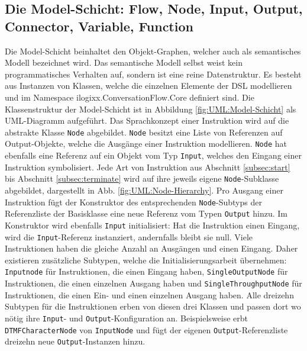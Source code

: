 \subsection[Die Model-Schicht]{Die Model-Schicht: Flow, Node, Input, Output, Connector, Variable, Function}
\label{subsec:Die Model-Schicht}
Die Model-Schicht beinhaltet den Objekt-Graphen, welcher auch als semantisches Modell bezeichnet wird. Das semantische Modell selbst weist kein programmatisches Verhalten auf, sondern ist eine reine Datenstruktur. Es besteht aus Instanzen von Klassen, welche die einzelnen Elemente der DSL modellieren und im Namespace ilogixx.ConversationFlow.Core definiert sind. Die Klassenstruktur der Model-Schicht ist in Abbildung \ref{fig:UML:Model-Schicht} als UML-Diagramm aufgeführt.
\newline
Das Sprachkonzept einer Instruktion wird auf die abstrakte Klasse \texttt{Node} abgebildet. \texttt{Node} besitzt eine Liste von Referenzen auf Output-Objekte, welche die Ausgänge einer Instruktion modellieren. \texttt{Node} hat ebenfalls eine Referenz auf ein Objekt vom Typ \texttt{Input}, welches den Eingang einer Instruktion symbolisiert. Jede Art von Instruktion aus Abschnitt \ref{subsec:start} bis Abschnitt \ref{subsec:terminate} wird auf ihre jeweils eigene \texttt{Node}-Subklasse abgebildet, dargestellt in Abb. \ref{fig:UML:Node-Hierarchy}. Pro Ausgang einer Instruktion fügt der Konstruktor des entsprechenden \texttt{Node}-Subtyps der Referenzliste der Basisklasse eine neue Referenz vom Typen \texttt{Output} hinzu. Im Konstruktor wird ebenfalls \texttt{Input} initialisiert: Hat die Instruktion einen Eingang, wird die \texttt{Input}-Referenz instanziert, andernfalls bleibt sie null. Viele Instruktionen haben die gleiche Anzahl an Ausgängen und einen Eingang. Daher existieren zusätzliche Subtypen, welche die Initialisierungsarbeit übernehmen: \texttt{Inputnode} für Instruktionen, die einen Eingang haben, \texttt{SingleOutputNode} für Instruktionen, die einen einzelnen Ausgang haben und \texttt{SingleThroughputNode} für Instruktionen, die einen Ein- und einen einzelnen Ausgang haben. Alle dreizehn Subtypen für die Instruktionen erben von diesen drei Klassen und passen dort wo nötig ihre \texttt{Input}- und \texttt{Output}-Konfiguration an. Beispielsweise erbt \texttt{DTMFCharacterNode} von \texttt{InputNode} und fügt der eigenen \texttt{Output}-Referenzliste dreizehn neue \texttt{Output}-Instanzen hinzu.
\newline
